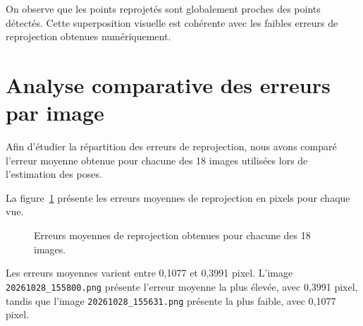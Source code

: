 \documentclass[12pt,a4paper]{report}
\begin{document}
On observe que les points reprojetés sont globalement proches des
points détectés. Cette superposition visuelle est cohérente avec
les faibles erreurs de reprojection obtenues numériquement.

\section{Analyse comparative des erreurs par image}

Afin d'étudier la répartition des erreurs de reprojection, nous
avons comparé l'erreur moyenne obtenue pour chacune des
18 images utilisées lors de l'estimation des poses.

La figure~\ref{fig:erreurs-par-image} présente les erreurs
moyennes de reprojection en pixels pour chaque vue.

\begin{figure}[H]
    \centering
    \caption{Erreurs moyennes de reprojection obtenues pour
    chacune des 18 images.}
    \label{fig:erreurs-par-image}
\end{figure}

Les erreurs moyennes varient entre 0,1077 et 0,3991 pixel.
L'image \texttt{20261028\_155800.png} présente l'erreur moyenne
la plus élevée, avec 0,3991 pixel, tandis que l'image
\texttt{20261028\_155631.png} présente la plus faible,
avec 0,1077 pixel.
\end{document}
